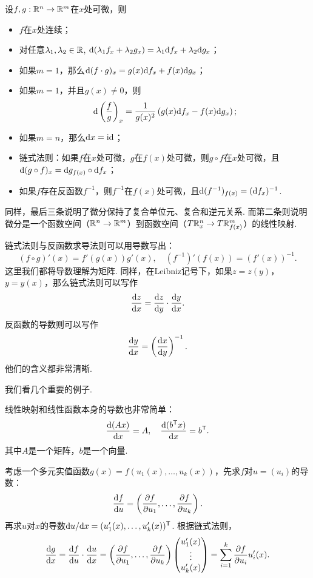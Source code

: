 \begin{proposition}\label{prop:derivative-property}
    设$f,g:\mathbb{R}^n\to\mathbb{R}^m$在$x$处可微，则
    \begin{itemize}
        \item $f$在$x$处连续；
        \item 对任意$\lambda_1,\lambda_2\in\mathbb{R}$, $\mathrm{d}(\lambda_1 f_x+\lambda_2 g_x)=\lambda_1\mathrm{d} f_x+\lambda_2\mathrm{d} g_x$；
        \item 如果$m=1$，那么$\mathrm{d}(f\cdot g)_x=g(x)\mathrm{d} f_x+f(x)\mathrm{d} g_x$；
        \item 如果$m=1$，并且$g(x)\neq 0$，则
        \[\mathrm{d}\left(\frac{f}{g}\right)_x=\frac{1}{g(x)^2}\left(g(x)\mathrm{d} f_x-f(x)\mathrm{d} g_x\right);\]
        \item 如果$m=n$，那么$\mathrm{d} x=\mathrm{id}$；
        \item 链式法则：如果$f$在$x$处可微，$g$在$f(x)$处可微，则$g\circ f$在$x$处可微，且$\mathrm{d}(g\circ f)_x=\mathrm{d} g_{f(x)}\circ\mathrm{d} f_x$；
        \item 如果$f$存在反函数$f^{-1}$，则$f^{-1}$在$f(x)$处可微，且$\mathrm{d}(f^{-1})_{f(x)}=(\mathrm{d} f_x)^{-1}$.
    \end{itemize}
\end{proposition}

同样，最后三条说明了微分保持了复合单位元、复合和逆元关系. 而第二条则说明微分是一个函数空间（$\mathbb{R}^n\to\mathbb{R}^m$）到函数空间（$T\mathbb{R}_x^n\to T\mathbb{R}^m_{f(x)}$）的线性映射.

链式法则与反函数求导法则可以用导数写出：
\[(f\circ g)'(x)=f'(g(x))g'(x),\quad (f^{-1})'(f(x))=(f'(x))^{-1}.\]
这里我们都将导数理解为矩阵. 同样，在Leibniz记号下，如果$z=z(y)$，$y=y(x)$，那么链式法则可以写作
\[
    \frac{\mathrm{d} z}{\mathrm{d} x}=\frac{\mathrm{d} z}{\mathrm{d} y}\cdot\frac{\mathrm{d} y}{\mathrm{d} x}.
\]
反函数的导数则可以写作
\[
    \frac{\mathrm{d} y}{\mathrm{d} x}=\left(\frac{\mathrm{d} x}{\mathrm{d} y}\right)^{-1}.
\]
他们的含义都非常清晰. 


我们看几个重要的例子. 

\begin{example}\label{ex:linear-derivative}
线性映射和线性函数本身的导数也非常简单：
\[\frac{\mathrm{d} (Ax)}{\mathrm{d} x}=A,\quad \frac{\mathrm{d} (b^{\mathsf{T}} x)}{\mathrm{d} x}=b^{\mathsf{T}}.\]
其中$A$是一个矩阵，$b$是一个向量. 
\end{example}

\begin{example}
    考虑一个多元实值函数$g(x)=f(u_1(x),\dots,u_k(x))$，先求$f$对$u=(u_i)$的导数：
    \[\frac{\mathrm{d} f}{\mathrm{d} u}=\left(\frac{\partial f}{\partial u_1},\dots,\frac{\partial f}{\partial u_k}\right).\]
    再求$u$对$x$的导数$\mathrm{d} u/\mathrm{d} x=(u_1'(x),\dots,u_k'(x))^{\mathsf{T}}$. 根据链式法则，
    \[\frac{\mathrm{d} g}{\mathrm{d} x}=\frac{\mathrm{d} f}{\mathrm{d} u}\cdot\frac{\mathrm{d} u}{\mathrm{d} x}=\left(\frac{\partial f}{\partial u_1},\dots,\frac{\partial f}{\partial u_k}\right)\begin{pmatrix}
        u_1'(x) \\
        \vdots \\
        u_k'(x)
    \end{pmatrix}=\sum_{i=1}^k\frac{\partial f}{\partial u_i}u_i'(x).\]
\end{example}

